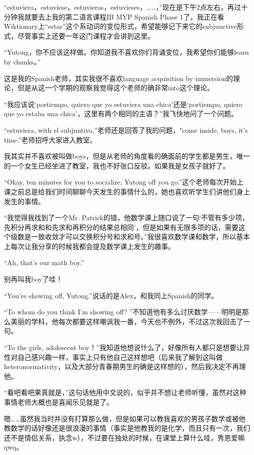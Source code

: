 \documentclass{article}
\begin{document}
“estuviera，estuviese，estuvieras，estuvieses，……，”现在是下午2点左右，再过十分钟我就要去上我的第二语言课程IB MYP Spanish Phase 1了，我正在看Wiktionary上“estas”这个系动词的变位形式，希望能够记下来它的subjunctive形式，尽管事实上还要一年这门课程才会讲到这里。

“Yutong，你不应该这样做。你知道我不喜欢你们背诵变位，我希望你们能够learn by chunks。”

这是我的Spanish老师，其实我很不喜欢language acquisition by immersion的理论，但是从这一个学期的观察我觉得这个老师的确非常into这个理论。

“我应该说‘portiempo, quiero que yo estuviera una chica’还是‘portiempo, quiero que yo estaba una chica’，这里有两个相同的主语？”我飞快地问了一个问题。

“estuviera, with el subjuntivo,”老师还是回答了我的问题，"come inside, boys, it's time.”老师招呼大家进入教室。

我其实并不喜欢被叫做boys，但是从老师的角度看的确面前的学生都是男生，唯一的一个女生已经坐进了教室，我也不好张口反驳。如果我是女孩子就好了。

“Okay, ten minutes for you to socialize, Yutong off you go.”这个老师每次开始上课之前总是给我们时间聊聊今天发生的事情什么的，她也喜欢听学生们讲他们身上发生的事情。

“我觉得我找到了一个Mr. Patrick的错，他数学课上随口说了一句‘不管有多少项，先积分再求和和先求和再积分的结果总相同’，但是如果有无限多项的话，需要这个级数是一致收敛才可以交换积分号和求和号。”我很喜欢数学课和数学，所以基本上每次让我分享的时候我都会提及数学课上发生的趣事。

“Ah, that's our math boy.”

别再叫我boy了哇！

“You're showing off, Yutong.”说话的是Alex，和我同上Spanish的同学。

“To whom do you think I'm showing off? ”不知道他有多么讨厌数学——明明是那么美丽的学科，他每次都要这样嘲讽我一番，今天也不例外，不过这次我回击了一句。

“To the girls, adolescent boy！”我知道他想说什么了，好像所有人都只是想要让异性对自己感兴趣一样，事实上只有他自己这样想吧（后来我了解到这叫做heteronormativity，以及大部分青春期男生的确是这样想的），然后我决定不再理他。

“看吧看吧果真就是，”这句话他用中文说的，似乎并不想让老师听懂，虽然对这种事情老师大概也是喜闻乐见就是了。

嗯……虽然我当时并没有打算那么做，但是如果可以教我喜欢的男孩子数学或被他教数学的话好像还是很浪漫的事情（事实是他教我的是化学，而且只有一次，我们还不是情侣关系，执念w），不过要在独处的时候，在课堂上算什么哇，秀恩爱嘛qwq。
\end{document}
